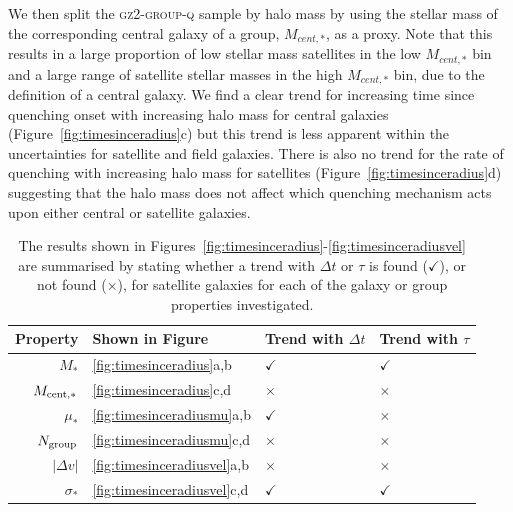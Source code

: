 \documentclass[useAMS,usenatbib]{mn2e}
\begin{document}
We then split the \textsc{gz2-group-q} sample by halo mass by using the stellar mass of the corresponding central galaxy of a group, $M_{cent,*}$, as a proxy. Note that this results in a large proportion of low stellar mass satellites in the low $M_{cent,*}$ bin and a large range of satellite stellar masses in the high $M_{cent,*}$ bin, due to the definition of a central galaxy. We find a clear trend for increasing time since quenching onset with increasing halo mass for central galaxies (Figure~\ref{fig:timesinceradius}c) but this trend is less apparent within the uncertainties for satellite and field galaxies. There is also no trend for the rate of quenching with increasing halo mass for satellites (Figure~\ref{fig:timesinceradius}d) suggesting that the halo mass does not affect which quenching mechanism acts upon either central or satellite galaxies. 


\begin{table}
\centering
\caption{The results shown in Figures~\ref{fig:timesinceradius}-\ref{fig:timesinceradiusvel} are summarised by stating whether a trend with $\Delta t$ or $\tau$ is found ($\checkmark$), or not found ($\times$), for satellite galaxies for each of the galaxy or group properties investigated.}
\label{table:summary}
%
%
%
\setlength\extrarowheight{3pt}
\begin{tabularx}{\textwidth}{r|C|C|C}

\hline
Property & Shown in Figure & Trend with $\Delta t$ & Trend with $\tau$        \\ \hline
$M_*$                 & \ref{fig:timesinceradius}a,b            & $\checkmark$           & $\checkmark$       \\
$M_{\rm{cent},*}$     & \ref{fig:timesinceradius}c,d            & $\times$               & $\times$           \\
$\mu_*$               & \ref{fig:timesinceradiusmu}a,b           & $\checkmark$           & $\times$           \\
$N_{\rm{group}}$      & \ref{fig:timesinceradiusmu}c,d           & $\times$               & $\times$           \\
$|\Delta v|$          & \ref{fig:timesinceradiusvel}a,b           & $\times$               & $\times$           \\
$\sigma_*$            & \ref{fig:timesinceradiusvel}c,d           & $\checkmark$           & $\checkmark$       \\ \hline

\end{tabularx}
\end{table}
\end{document}
